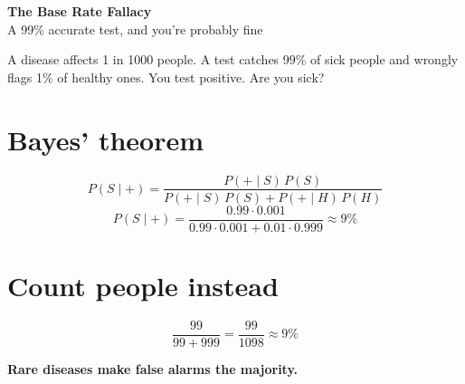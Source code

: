 \documentclass[11pt]{article}
\begin{document}
\begin{center}
  {\LARGE\bfseries The Base Rate Fallacy}\\[4pt]
  {\large A 99\% accurate test, and you're probably fine}
\end{center}

A disease affects 1 in 1000 people. A test catches 99\% of
sick people and wrongly flags 1\% of healthy ones.
You test positive. Are you sick?

\section*{Bayes' theorem}
\[
  P(S \mid +) = \frac{P(+ \mid S)\,P(S)}
    {P(+ \mid S)\,P(S) + P(+ \mid H)\,P(H)}
\]
\[
  P(S \mid +) = \frac{0.99 \cdot 0.001}
    {0.99 \cdot 0.001 + 0.01 \cdot 0.999} \approx 9\%
\]

\section*{Count people instead}
\begin{center}
\end{center}
\[
  \frac{99}{99 + 999} = \frac{99}{1098} \approx 9\%
\]
\centerline{\bfseries Rare diseases make false alarms the majority.}
\end{document}
